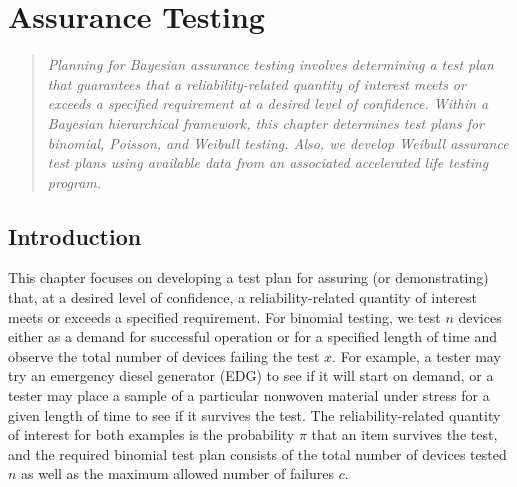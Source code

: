 \documentclass {book}
\begin{document}
\chapter{Assurance Testing}\label{ch10}

\begin{quote}
\textit{Planning for Bayesian assurance testing involves
determining a test plan that guarantees that a reliability-related
quantity of interest meets or exceeds a specified requirement at a
desired level of confidence. Within a Bayesian hierarchical
framework, this chapter determines test plans for binomial, Poisson, and
Weibull testing. Also, we develop Weibull assurance test plans
using available data from an associated accelerated life testing
program.}
\end{quote} 

\section{Introduction}\label{ch10:sec1}
This chapter focuses on developing a test plan  for assuring (or demonstrating) that, at a desired level of
confidence, a reliability-related quantity of interest meets or
exceeds a specified requirement. For binomial testing, we test $n$
devices either as a demand for successful operation or for a
specified length of time and observe the total number of devices
failing the test $x$. For example, a tester may try an emergency
diesel generator (EDG) to see if it will start on demand, or a
tester may place a sample of a particular nonwoven material under
stress for a given length of time to see if it survives the test.
The reliability-related quantity of interest for both examples is
the probability $\pi$ that an item survives the test, and the
required binomial test plan
consists of the total number of devices tested $n$ as well as the
maximum allowed number of failures $c$.
\end{document}
